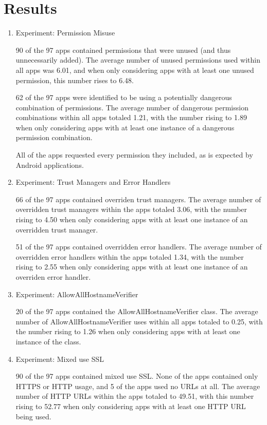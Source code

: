 \section{Results}
\label{sec:discussion}

\begin{enumerate}
    \item Experiment: Permission Misuse
    
    90 of the 97 apps contained permissions that were 
    unused (and thus unnecessarily added). The average number 
    of unused permissions used within all apps was 6.01, 
    and when only considering apps with at least one 
    unused permission, this number rises to 6.48.

    62 of the 97 apps were identified to be using a potentially dangerous
    combination of permissions. The average number of dangerous permission
    combinations within all apps totaled 1.21, with the number
    rising to 1.89 when only considering apps with at least one
    instance of a dangerous permission combination.

    All of the apps requested every permission they included, as is expected by Android applications. 

    \item Experiment: Trust Managers and Error Handlers
    
    66 of the 97 apps contained overriden trust managers.
    The average number of overridden trust managers within the 
    apps totaled 3.06, with the number rising to 4.50 when only 
    considering apps with at least one instance of an overridden trust 
    manager.

    51 of the 97 apps contained overridden error handlers.
    The average number of overridden error handlers within the apps
    totaled 1.34, with the number rising to 2.55 when only considering apps
    with at least one instance of an overriden error handler.

    \item Experiment: AllowAllHostnameVerifier
    
    20 of the 97 apps contained the AllowAllHostnameVerifier class. 
    The average number of AllowAllHostnameVerifier uses within all
    apps totaled to 0.25, with the number rising to 1.26 when only
    considering apps with at least one instance of the class.

    \item Experiment: Mixed use SSL
    
    90 of the 97 apps contained mixed use SSL. None of the apps 
    contained only HTTPS or HTTP usage, and 5 of the apps used no 
    URLs at all. The average number of HTTP URLs within the apps 
    totaled to 49.51, with this number rising to 52.77 when only 
    considering apps with at least one HTTP URL being used.


\end{enumerate}
